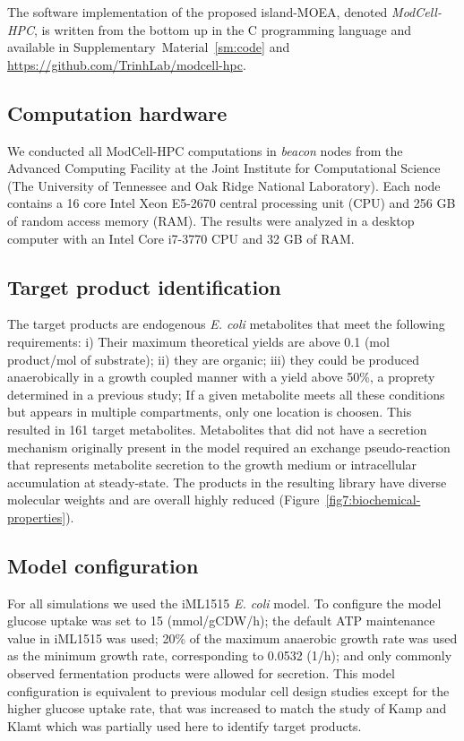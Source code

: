 \documentclass[12pt]{article}
\begin{document}
{The software implementation of the proposed island-MOEA, denoted \textit{ModCell-HPC}, is written from the bottom up in the C programming language and available in Supplementary~Material~\ref{sm:code} and \url{https://github.com/TrinhLab/modcell-hpc}.

\subsection{Computation hardware}
We conducted all ModCell-HPC computations in \emph{beacon} nodes from the Advanced Computing Facility at the Joint Institute for Computational Science (The University of Tennessee and Oak Ridge National Laboratory). Each node contains a 16 core Intel Xeon E5-2670 central processing unit (CPU) and 256 GB of random access memory (RAM). The results were analyzed in a desktop computer with an Intel Core i7-3770 CPU and 32 GB of RAM.

\subsection{Target product identification}
The target products are endogenous \textit{E. coli} metabolites that meet the following requirements: i) Their maximum theoretical yields are above 0.1 (mol product/mol of substrate); ii) they are organic; iii) they could be produced anaerobically in a growth coupled manner with a yield above 50\%, a proprety determined in a previous study;\citep{kamp2017}
If a given metabolite meets all these conditions but appears in multiple compartments, only one location is choosen.  %
This resulted in 161 target metabolites.
Metabolites that did not have a secretion mechanism originally present in the model required an exchange pseudo-reaction that represents metabolite secretion to the growth medium or intracellular accumulation at steady-state.
The products in the resulting library have diverse molecular weights and are overall highly reduced %
(Figure~\ref{fig7:biochemical-properties}).

\subsection{Model configuration}
For all simulations we used the iML1515 \textit{E. coli} model.\citep{monk2017}
To configure the model glucose uptake was set to 15 (mmol/gCDW/h); the default ATP maintenance value in iML1515 was used; 20\% of the maximum anaerobic growth rate was used as the minimum growth rate, corresponding to 0.0532 (1/h); and only commonly observed fermentation products were allowed for secretion. This model configuration is equivalent to previous modular cell design studies\citep{garcia2019} except for the higher glucose uptake rate, that was increased to match the study of Kamp and Klamt\citep{kamp2017} which was partially used here to identify target products.

}
\end{document}
